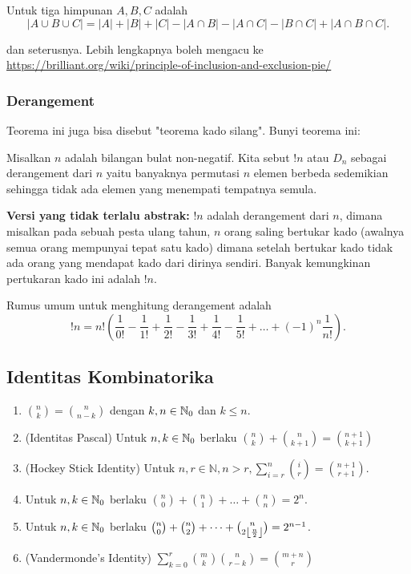Untuk tiga himpunan $A,B,C$ adalah
$$|A \cup B \cup C|=|A|+|B|+|C|-|A \cap B|-|A \cap C|-|B \cap C|+|A \cap B \cap C|.$$

dan seterusnya. Lebih lengkapnya boleh mengacu ke \href{https://brilliant.org/wiki/principle-of-inclusion-and-exclusion-pie/}{https://brilliant.org/wiki/principle-of-inclusion-and-exclusion-pie/}

\subsubsection{Derangement}
Teorema ini juga bisa disebut "teorema kado silang". Bunyi teorema ini:

Misalkan $n$ adalah bilangan bulat non-negatif. Kita sebut $!n$ atau $D_n$ sebagai derangement dari $n$ yaitu banyaknya permutasi $n$ elemen berbeda sedemikian sehingga tidak ada elemen yang menempati tempatnya semula.

\textbf{Versi yang tidak terlalu abstrak:} $!n$ adalah derangement dari $n$, dimana misalkan pada sebuah pesta ulang tahun, $n$ orang saling bertukar kado (awalnya semua orang mempunyai tepat satu kado) dimana setelah bertukar kado tidak ada orang yang mendapat kado dari dirinya sendiri. Banyak kemungkinan pertukaran kado ini adalah $!n$.

Rumus umum untuk menghitung derangement adalah
$$!n = n! \left(\dfrac{1}{0!}-\dfrac{1}{1!}+\dfrac{1}{2!}-\dfrac{1}{3!}+\dfrac{1}{4!}-\dfrac{1}{5!}+\dots+(-1)^n\dfrac{1}{n!}\right).$$

\subsection{Identitas Kombinatorika}
\begin{enumerate}
    \item  ${n \choose k} = {n \choose n-k}$ dengan $k,n \in \mathbb N_0$ dan $k \le n$.
    \item (Identitas Pascal) Untuk $n,k \in \mathbb N_0$ berlaku ${n \choose k} + {n \choose k+1} = {n+1 \choose k+1}$
    \item (Hockey Stick Identity) Untuk $n,r\in\mathbb{N}, n>r,\sum^n_{i=r}{i\choose r}={n+1\choose r+1}$.
    \item Untuk $n,k \in \mathbb N_0$ berlaku ${n \choose 0}+{n \choose 1} + \dots + {n \choose n} = 2^{n}$.
    \item Untuk $n,k \in \mathbb N_0$ berlaku ${n \choose 0}+{n \choose 2} + \dots + {n \choose 2\left\lfloor \frac{n}{2} \right\rfloor} = 2^{n-1}$.
    \item (Vandermonde's Identity)  $\sum_{k=0}^r\binom mk\binom n{r-k}=\binom{m+n}r$
\end{enumerate}

